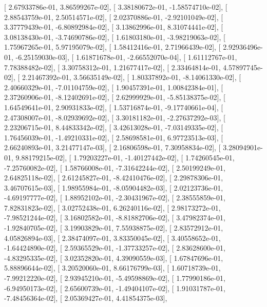 \documentclass{article}
\begin{document}
       [ 2.67933786e-01,  3.86599267e-02],
       [ 3.38180672e-01, -1.58574710e-02],
       [ 2.88543759e-01,  2.50514571e-02],
       [ 2.02370886e-01, -2.92101049e-02],
       [ 3.37779439e-01, -6.80892984e-02],
       [ 3.13862996e-01,  8.31074441e-02],
       [ 3.08138430e-01, -3.74690786e-02],
       [ 1.61803180e-01, -3.98219063e-02],
       [ 1.75967265e-01,  5.97195079e-02],
       [ 1.58412416e-01,  2.71966439e-02],
       [ 2.92936496e-01, -6.25159030e-03],
       [ 1.61871678e-01, -2.66552070e-04],
       [ 1.61112767e-01,  7.78388482e-02],
       [ 3.30758312e-01,  1.21677417e-02],
       [ 2.33464814e-01,  4.57897745e-02],
       [ 2.21467392e-01,  3.56635149e-02],
       [ 1.80337892e-01, -8.14061330e-02],
       [ 2.40660329e-01, -7.01104759e-02],
       [ 1.90457391e-01,  1.00842384e-01],
       [ 2.37260906e-01, -8.12402691e-02],
       [ 2.62999929e-01, -5.85138375e-02],
       [ 1.64549641e-01,  2.90931833e-02],
       [ 1.53716874e-01, -9.17740661e-04],
       [ 2.47308007e-01, -8.02939692e-02],
       [ 3.30181182e-01, -2.27637292e-03],
       [ 2.23206715e-01,  8.44833342e-02],
       [ 3.42613028e-01, -7.03149335e-02],
       [ 1.76456039e-01, -1.49210331e-02],
       [ 2.58698581e-01,  6.97723513e-03],
       [ 2.66240893e-01,  3.21477147e-03],
       [ 2.16806598e-01,  7.30958834e-02],
       [ 3.28094901e-01,  9.88179215e-02],
       [ 1.79203227e-01, -1.40127442e-02],
       [ 1.74260545e-01, -7.25760082e-02],
       [ 1.58766008e-01, -7.31642244e-02],
       [ 2.50199249e-01,  2.64825118e-02],
       [ 2.61245827e-01, -8.42410476e-02],
       [ 2.29878306e-01,  3.46707615e-03],
       [ 1.98955984e-01, -8.05904482e-03],
       [ 2.02123736e-01, -4.69197777e-02],
       [ 1.88952102e-01, -2.30431967e-02],
       [ 2.38555859e-01,  7.82831823e-02],
       [ 3.02752438e-01,  6.26240116e-02],
       [ 2.98173272e-01, -7.98521244e-02],
       [ 3.16802582e-01, -8.81882706e-02],
       [ 3.47982374e-01, -1.92840705e-02],
       [ 3.19903829e-01,  7.55938875e-02],
       [ 2.83572912e-01,  4.05826894e-03],
       [ 2.38474097e-01,  3.83350045e-02],
       [ 3.40558652e-01, -1.64424890e-02],
       [ 2.59365529e-01, -1.37733257e-02],
       [ 2.83628600e-01, -4.83295335e-02],
       [ 3.02352820e-01,  4.39090559e-03],
       [ 1.67847696e-01,  5.88896644e-02],
       [ 3.20520060e-01,  8.66176799e-03],
       [ 1.60718739e-01, -7.99212220e-02],
       [ 2.93945210e-01, -5.49598869e-02],
       [ 1.77990186e-01, -6.94950173e-02],
       [ 2.65600739e-01, -1.49404107e-02],
       [ 1.91031787e-01, -7.48456364e-02],
       [ 2.05369427e-01,  4.41854375e-03],
\end{document}
